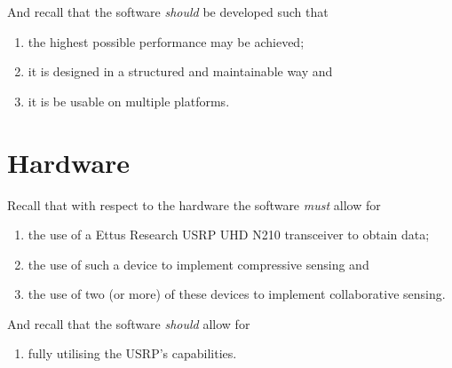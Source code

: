\documentclass[a4paper, openany, oneside]{memoir}
\begin{document}
And recall that the software \emph{should} be developed such that
\begin{enumerate}
    \item the highest possible performance may be achieved;
    \item it is designed in a structured and maintainable way and
    \item it is be usable on multiple platforms.
\end{enumerate}

\section{Hardware}

Recall that with respect to the hardware the software \emph{must} allow for
\begin{enumerate}
    \item the use of a Ettus Research USRP UHD N210 transceiver to obtain data;
    \item the use of such a device to implement compressive sensing and
    \item the use of two (or more) of these devices to implement collaborative sensing.
\end{enumerate}

And recall that the software \emph{should} allow for
\begin{enumerate}
    \item fully utilising the USRP's capabilities.
\end{enumerate}
\end{document}
